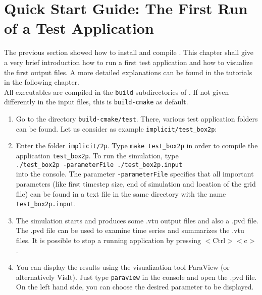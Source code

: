\section[Quick Start Guide]{Quick Start Guide: The First Run of a Test Application}\label{quick-start-guide}

The previous section showed how to install and compile \Dumux. This chapter
shall give a very brief introduction how to run a first test application and how
to visualize the first output files. A more detailed explanations can be found in
the tutorials in the following chapter.\\
All executables are compiled in the \texttt{build} subdirectories of \Dumux.
If not given differently in the input files, this is \texttt{build-cmake} as default.

\begin{enumerate}
\item Go to the directory \texttt{build-cmake/test}. There, various test application
      folders can be found. Let us consider as example \texttt{implicit/test{\_}box2p}:
\item Enter the folder \texttt{implicit/2p}. Type \texttt{make test{\_}box2p} in order
      to compile the application \texttt{test{\_}box2p}. To run the simulation, type\\
      \texttt{./test{\_}box2p -parameterFile ./test\_box2p.input}\\
      into the console. The parameter \texttt{-parameterFile} specifies that all
      important parameters (like first timestep size, end of simulation and location
      of the grid file) can be found in a text file in the same directory  with the
      name \texttt{test\_box2p.input}.
\item The simulation starts and produces some .vtu output files and also a .pvd
      file. The .pvd file can be used to examine time series and summarizes the .vtu
      files. It is possible to stop a running application by pressing $<$Ctrl$><$c$>$.
\item You can display the results using the visualization tool ParaView (or
      alternatively VisIt). Just type \texttt{paraview} in the console and open the
      .pvd file. On the left hand side, you can choose the desired parameter to be displayed.
\end{enumerate}
